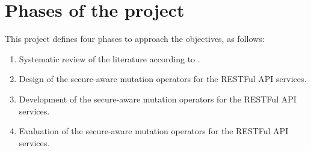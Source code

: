 
\section{Phases of the project} \label{sec:phases}
This project defines four phases to approach the objectives, as follows:
  \begin{enumerate}
    \item Systematic review of the literature according to \cite{Kitchenham2002}.
    \item Design of the secure-aware mutation operators for the RESTFul API services.
    \item Development of the secure-aware mutation operators for the RESTFul API services.
    \item Evaluation of the secure-aware mutation operators for the RESTFul API services.
\end{enumerate}


